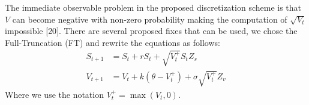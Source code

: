 \documentclass[12pt,twoside]{reedthesis}
\theoremstyle{definition}
\theoremstyle{definition}
\theoremstyle{remark}
\begin{document}
  The immediate observable problem in the proposed discretization scheme
  is that \(V\) can become negative with non-zero probability making the
  computation of \(\sqrt{V_t}\) impossible {[}20{]}. There are several
  proposed fixes that can be used, we chose the Full-Truncation (FT) and
  rewrite the equations as follows:
  \begin{align}
  S_{t+1} &= S_t + rS_t + \sqrt{V_{t}^{+}} S_t Z_s \\
  V_{t+1} &= V_t + k (\theta - V_{t}^{+}) + \sigma \sqrt{V_{t}^{+}} Z_v
  \end{align}
  \noindent
  Where we use the notation \(V_{t}^{+} = \max(V_{t}, 0)\).
  \begin{Shaded}
  \begin{Highlighting}[]
  \StringTok{ } \NormalTok{, }
                           \NormalTok{, }  \NormalTok{)\{}
  
      \NormalTok{(}\NormalTok{)}
  
      \StringTok{ }\NormalTok{\}}
  
      \StringTok{ }
      \StringTok{ }
      \StringTok{ }
  
          \StringTok{ }
          \StringTok{ }
          \StringTok{ }\StringTok{ }\StringTok{ }\NormalTok{(}\NormalTok{(} \NormalTok{-}\StringTok{ }\NormalTok{)) *}\StringTok{ }
  
  
          \StringTok{ }
          \NormalTok{aux[v <}\StringTok{ }\NormalTok{] <-}\StringTok{ }
          \StringTok{ }
          \StringTok{ }\StringTok{ }\NormalTok{(} \NormalTok{+}\StringTok{ }\StringTok{ }\StringTok{ }\StringTok{ }\StringTok{ }
          \NormalTok{S[S <=}\StringTok{ }\NormalTok{] =}\StringTok{ }
  

\end{Highlighting}
\end{Shaded}
\end{document}
